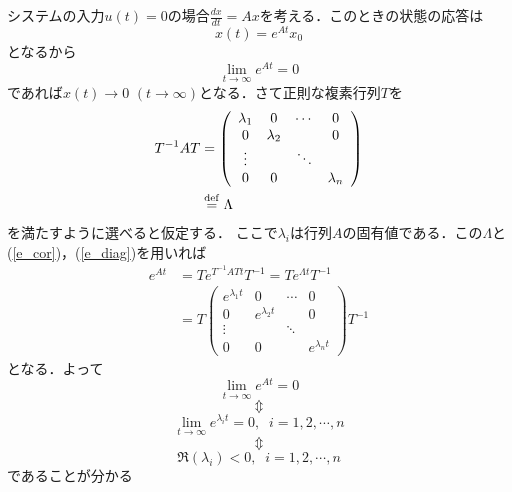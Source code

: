 システムの入力$u(t)=0$の場合$\frac{dx}{dt} = Ax$を考える．このときの状態の応答は
\begin{equation}
 x(t) = e^{At} x_0
\end{equation}
となるから
\begin{equation}
 \lim_{t \rightarrow \infty} e^{At} = 0
\end{equation}
であれば$x(t) \rightarrow 0$ $(t \rightarrow \infty)$となる．さて正則な複素行列$T$を
\begin{align}
 T^{-1} A T
  &=
  \left(\begin{array}{cccc}
         \lambda_1 & 0         & \cdots & 0 \\
	 0         & \lambda_2 &        & 0 \\
	 \vdots    &           & \ddots & \\
	 0         & 0         &        & \lambda_n 
	\end{array}\right) \nonumber \\
 &\stackrel{\rm def}{=} \Lambda
\end{align}
を満たすように選べると仮定する．
ここで$\lambda_i$は行列$A$の固有値である．この$\Lambda$と(\ref{e_cor})，(\ref{e_diag})を用いれば
\begin{align}
 e^{At} 
  &= T e^{T^{-1} A T t} T^{-1}= T e^{\Lambda t} T^{-1} \nonumber \\
 &= T
  \left(\begin{array}{cccc}
         e^{\lambda_1 t} & 0               & \cdots & 0 \\
	 0               & e^{\lambda_2 t} &        & 0 \\
	 \vdots          &                 & \ddots &   \\
	 0               & 0               &        & e^{\lambda_n t}
	\end{array}\right)
  T^{-1}
\end{align}
となる．よって
\begin{equation}
 \lim_{t \rightarrow \infty} e^{At} = 0
\end{equation}
\[\Updownarrow\]
\begin{equation}
 \lim_{t \rightarrow \infty} e^{\lambda_i t } = 0, \;\;
  i = 1, 2, \cdots, n
\end{equation}
\[\Updownarrow\]
\begin{equation}
 \Re(\lambda_i) < 0, \;\; i = 1, 2, \cdots, n
\end{equation}
であることが分かる
